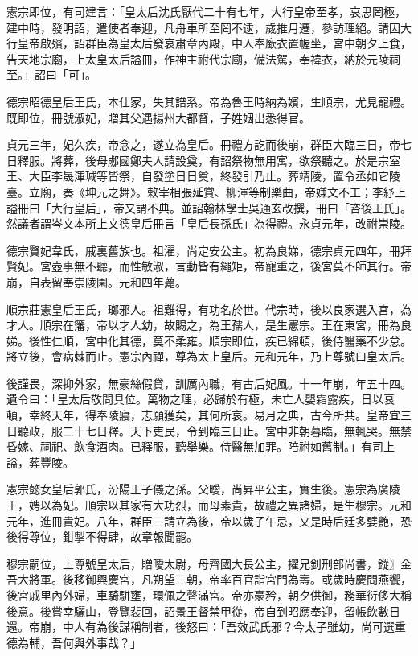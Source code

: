 \begin{pinyinscope}
 憲宗即位，有司建言：「皇太后沈氏厭代二十有七年，大行皇帝至孝，哀思罔極，建中時，發明詔，遣使者奉迎，凡舟車所至罔不逮，歲推月遷，參訪理絕。請因大行皇帝啟殯，詔群臣為皇太后發哀肅章內殿，中人奉廞衣置幄坐，宮中朝夕上食，告天地宗廟，上太皇太后謚冊，作神主祔代宗廟，備法駕，奉褘衣，納於元陵祠至。」詔曰「可」。



 德宗昭德皇后王氏，本仕家，失其譜系。帝為魯王時納為嬪，生順宗，尤見寵禮。既即位，冊號淑妃，贈其父遇揚州大都督，子姓姻出悉得官。



 貞元三年，妃久疾，帝念之，遂立為皇后。冊禮方訖而後崩，群臣大臨三日，帝七日釋服。將葬，後母郕國鄭夫人請設奠，有詔祭物無用寓，欲祭聽之。於是宗室王、大臣李晟渾瑊等皆祭，自發塗日日奠，終發引乃止。葬靖陵，置令丞如它陵臺。立廟，奏《坤元之舞》。敕宰相張延賞、柳渾等制樂曲，帝嫌文不工；李紓上謚冊曰「大行皇后」，帝又謂不典。並詔翰林學士吳通玄改撰，冊曰「咨後王氏」。然議者謂岑文本所上文德皇后冊言「皇后長孫氏」為得禮。永貞元年，改祔崇陵。



 德宗賢妃韋氏，戚裏舊族也。祖濯，尚定安公主。初為良娣，德宗貞元四年，冊拜賢妃。宮壺事無不聽，而性敏淑，言動皆有繩矩，帝寵重之，後宮莫不師其行。帝崩，自表留奉崇陵園。元和四年薨。



 順宗莊憲皇后王氏，瑯邪人。祖難得，有功名於世。代宗時，後以良家選入宮，為才人。順宗在籓，帝以才人幼，故賜之，為王孺人，是生憲宗。王在東宮，冊為良娣。後性仁順，宮中化其德，莫不柔雍。順宗即位，疾已綿頓，後侍醫藥不少怠。將立後，會病棘而止。憲宗內禪，尊為太上皇后。元和元年，乃上尊號曰皇太后。



 後謹畏，深抑外家，無豪絲假貸，訓厲內職，有古后妃風。十一年崩，年五十四。遺令曰：「皇太后敬問具位。萬物之理，必歸於有極，未亡人嬰霜露疾，日以衰頓，幸終天年，得奉陵寢，志願獲矣，其何所哀。易月之典，古今所共。皇帝宜三日聽政，服二十七日釋。天下吏民，令到臨三日止。宮中非朝暮臨，無輒哭。無禁昏嫁、祠祀、飲食酒肉。已釋服，聽舉樂。侍醫無加罪。陪祔如舊制。」有司上謚，葬豐陵。



 憲宗懿女皇后郭氏，汾陽王子儀之孫。父曖，尚昇平公主，實生後。憲宗為廣陵王，娉以為妃。順宗以其家有大功烈，而母素貴，故禮之異諸婦，是生穆宗。元和元年，進冊貴妃。八年，群臣三請立為後，帝以歲子午忌，又是時后廷多嬖艷，恐後得尊位，鉗掣不得肆，故章報聞罷。



 穆宗嗣位，上尊號皇太后，贈曖太尉，母齊國大長公主，擢兄釗刑部尚書，鏦〗金吾大將軍。後移御興慶宮，凡朔望三朝，帝率百官詣宮門為壽。或歲時慶問燕饗，後宮戚里內外婦，車騎駢壅，環佩之聲滿宮。帝亦豪矜，朝夕供御，務華衍侈大稱後意。後嘗幸驪山，登覽裴回，詔景王督禁甲從，帝自到昭應奉迎，留帳飲數日還。帝崩，中人有為後謀稱制者，後怒曰：「吾效武氏邪？今太子雖幼，尚可選重德為輔，吾何與外事哉？」




\end{pinyinscope}
